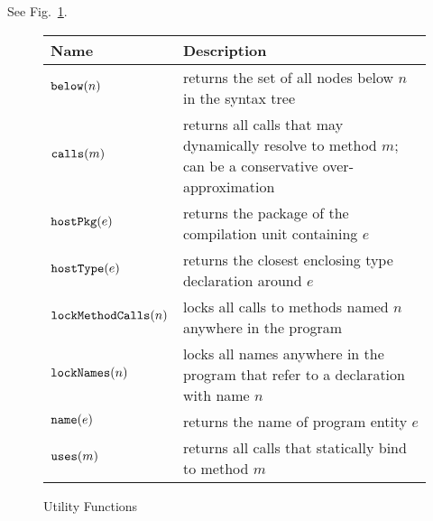 See Fig.~\ref{fig:utility}.

\begin{figure}[hb]
\begin{center}
\begin{tabular}{|l|p{5.3cm}|}
\hline
\textbf{Name} & \textbf{Description} \\ \hline\hline
$\text{\texttt{below}}(n)$ & returns the set of all nodes below $n$ in the syntax tree \\
$\text{\texttt{calls}}(m)$ & returns all calls that may dynamically resolve to method $m$; can be a conservative over-approximation \\
$\text{\texttt{hostPkg}}(e)$ & returns the package of the compilation unit containing $e$ \\
$\text{\texttt{hostType}}(e)$ & returns the closest enclosing type declaration around $e$ \\
$\text{\texttt{lockMethodCalls}}(n)$ & locks all calls to methods named $n$ anywhere in the program \\
$\text{\texttt{lockNames}}(n)$ & locks all names anywhere in the program that refer to a declaration with name $n$ \\
$\text{\texttt{name}}(e)$ & returns the name of program entity $e$ \\
$\text{\texttt{uses}}(m)$ & returns all calls that statically bind to method $m$ \\
\hline
\end{tabular}
\end{center}
\caption{Utility Functions}
\label{fig:utility}
\end{figure}
